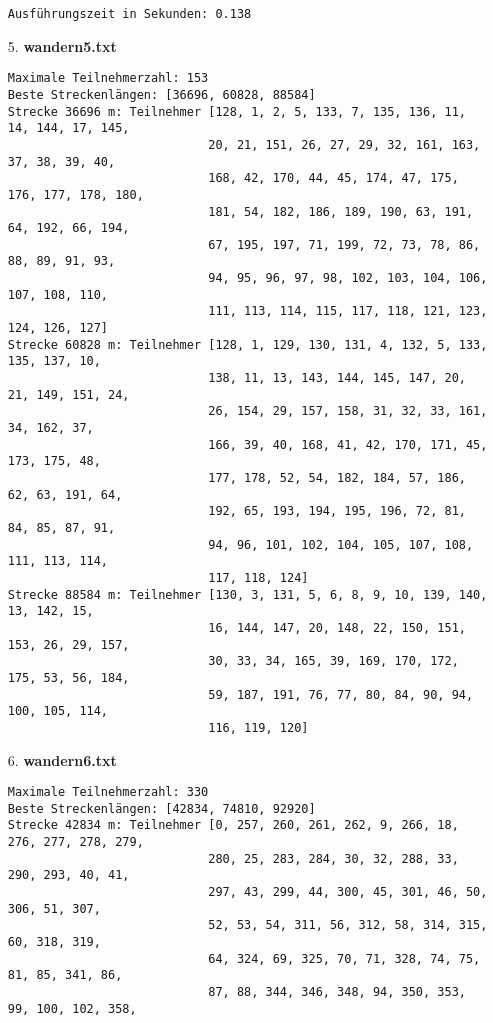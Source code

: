 \documentclass[a4paper,10pt,ngerman]{scrartcl}
\begin{document}
\begin{itemize}
\begin{verbatim}
Ausführungszeit in Sekunden: 0.138
  \end{verbatim}
  \item [5.] \textbf{wandern5.txt}
  \begin{verbatim}
Maximale Teilnehmerzahl: 153
Beste Streckenlängen: [36696, 60828, 88584]
Strecke 36696 m: Teilnehmer [128, 1, 2, 5, 133, 7, 135, 136, 11, 14, 144, 17, 145, 
                            20, 21, 151, 26, 27, 29, 32, 161, 163, 37, 38, 39, 40,
                            168, 42, 170, 44, 45, 174, 47, 175, 176, 177, 178, 180, 
                            181, 54, 182, 186, 189, 190, 63, 191, 64, 192, 66, 194, 
                            67, 195, 197, 71, 199, 72, 73, 78, 86, 88, 89, 91, 93, 
                            94, 95, 96, 97, 98, 102, 103, 104, 106, 107, 108, 110, 
                            111, 113, 114, 115, 117, 118, 121, 123, 124, 126, 127]
Strecke 60828 m: Teilnehmer [128, 1, 129, 130, 131, 4, 132, 5, 133, 135, 137, 10, 
                            138, 11, 13, 143, 144, 145, 147, 20, 21, 149, 151, 24, 
                            26, 154, 29, 157, 158, 31, 32, 33, 161, 34, 162, 37, 
                            166, 39, 40, 168, 41, 42, 170, 171, 45, 173, 175, 48, 
                            177, 178, 52, 54, 182, 184, 57, 186, 62, 63, 191, 64, 
                            192, 65, 193, 194, 195, 196, 72, 81, 84, 85, 87, 91, 
                            94, 96, 101, 102, 104, 105, 107, 108, 111, 113, 114, 
                            117, 118, 124]
Strecke 88584 m: Teilnehmer [130, 3, 131, 5, 6, 8, 9, 10, 139, 140, 13, 142, 15, 
                            16, 144, 147, 20, 148, 22, 150, 151, 153, 26, 29, 157, 
                            30, 33, 34, 165, 39, 169, 170, 172, 175, 53, 56, 184, 
                            59, 187, 191, 76, 77, 80, 84, 90, 94, 100, 105, 114, 
                            116, 119, 120]
  \end{verbatim}
  \item [6.] \textbf{wandern6.txt}
  \begin{verbatim}
Maximale Teilnehmerzahl: 330
Beste Streckenlängen: [42834, 74810, 92920]
Strecke 42834 m: Teilnehmer [0, 257, 260, 261, 262, 9, 266, 18, 276, 277, 278, 279, 
                            280, 25, 283, 284, 30, 32, 288, 33, 290, 293, 40, 41, 
                            297, 43, 299, 44, 300, 45, 301, 46, 50, 306, 51, 307, 
                            52, 53, 54, 311, 56, 312, 58, 314, 315, 60, 318, 319, 
                            64, 324, 69, 325, 70, 71, 328, 74, 75, 81, 85, 341, 86, 
                            87, 88, 344, 346, 348, 94, 350, 353, 99, 100, 102, 358, 

\end{verbatim}
\end{itemize}
\end{document}
